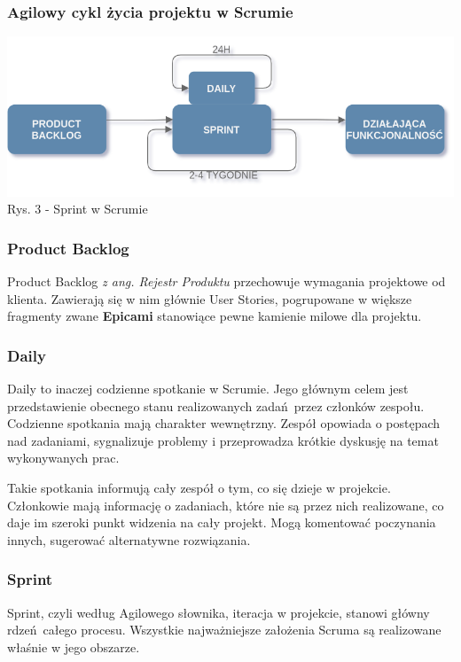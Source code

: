 \documentclass{article}
\begin{document}
\subsubsection*{Agilowy cykl życia projektu w Scrumie}

\begin{center}
    \includegraphics[scale=0.35]{scrum.png}
    \newline
    Rys. 3 - Sprint w Scrumie
\end{center}

\subsubsection*{Product Backlog}
Product Backlog \textit{z ang. Rejestr Produktu} przechowuje wymagania projektowe od klienta. Zawierają się w nim głównie User Stories, pogrupowane w większe fragmenty zwane \textbf{Epicami} stanowiące pewne kamienie milowe dla projektu.

\subsubsection*{Daily}
Daily to inaczej codzienne spotkanie w Scrumie. Jego głównym celem jest przedstawienie obecnego stanu realizowanych zadań przez członków zespołu. Codzienne spotkania mają charakter wewnętrzny. Zespół opowiada o postępach nad zadaniami, sygnalizuje problemy i przeprowadza krótkie dyskusję na temat wykonywanych prac.

Takie spotkania informują cały zespół o tym, co się dzieje w projekcie. Członkowie mają informację o zadaniach, które nie są przez nich realizowane, co daje im szeroki punkt widzenia na cały projekt. Mogą komentować poczynania innych, sugerować alternatywne rozwiązania.

\subsubsection*{Sprint}
Sprint, czyli według Agilowego słownika, iteracja w projekcie, stanowi główny rdzeń całego procesu. Wszystkie najważniejsze założenia Scruma są realizowane właśnie w jego obszarze.
\end{document}
